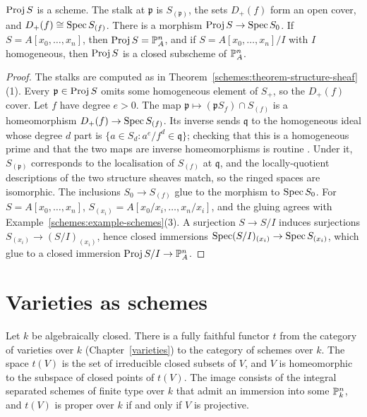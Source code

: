\begin{proposition}\label{schemes:proposition-proj}
$\operatorname{Proj} S$ is a scheme. The stalk at $\mathfrak{p}$ is $S_{(\mathfrak{p})}$, the sets $D_+(f)$ form an open cover, and $D_+(f) \cong \operatorname{Spec} S_{(f)}$. There is a
morphism $\operatorname{Proj} S \to \operatorname{Spec} S_0$. If $S = A[x_0, \ldots, x_n]$, then $\operatorname{Proj} S = \mathbb{P}^n_A$, and if $S = A[x_0, \ldots, x_n]/I$ with $I$ homogeneous, then
$\operatorname{Proj} S$ is a closed subscheme of $\mathbb{P}^n_A$.
\end{proposition}

\begin{proof}
The stalks are computed as in Theorem~\ref{schemes:theorem-structure-sheaf}(1). Every $\mathfrak{p} \in \operatorname{Proj} S$ omits some homogeneous element of
$S_+$, so the $D_+(f)$ cover. Let $f$ have degree $e > 0$. The map $\mathfrak{p} \mapsto (\mathfrak{p}S_f) \cap S_{(f)}$ is a homeomorphism
$D_+(f) \to \operatorname{Spec} S_{(f)}$. Its inverse sends $\mathfrak{q}$ to the homogeneous ideal whose degree $d$ part is $\{a \in S_d : a^e/f^d \in \mathfrak{q}\}$; checking
that this is a homogeneous prime and that the two maps are inverse homeomorphisms is routine \cite[Proposition II.2.5]{hartshorne-ag}. Under it,
$S_{(\mathfrak{p})}$ corresponds to the localisation of $S_{(f)}$ at $\mathfrak{q}$, and the locally-quotient descriptions of the two structure sheaves
match, so the ringed spaces are isomorphic. The inclusions $S_0 \to S_{(f)}$ glue to the morphism to $\operatorname{Spec} S_0$. For $S = A[x_0, \ldots, x_n]$,
$S_{(x_i)} = A[x_0/x_i, \ldots, x_n/x_i]$, and the gluing agrees with Example~\ref{schemes:example-schemes}(3). A surjection $S \to S/I$ induces
surjections $S_{(x_i)} \to (S/I)_{(x_i)}$, hence closed immersions $\operatorname{Spec}(S/I)_{(x_i)} \to \operatorname{Spec} S_{(x_i)}$, which glue to a closed immersion
$\operatorname{Proj} S/I \to \mathbb{P}^n_A$.
\end{proof}

\section{Varieties as schemes}\label{schemes:section-varieties}

\begin{theorem}\label{schemes:theorem-varieties-schemes}
Let $k$ be algebraically closed. There is a fully faithful functor $t$ from the category of varieties over $k$ (Chapter~\ref{varieties}) to the category of
schemes over $k$. The space $t(V)$ is the set of irreducible closed subsets of $V$, and $V$ is homeomorphic to the subspace of closed points of $t(V)$.
The image consists of the integral separated schemes of finite type over $k$ that admit an immersion into some $\mathbb{P}^n_k$, and $t(V)$ is proper over $k$ if
and only if $V$ is projective.
\end{theorem}

